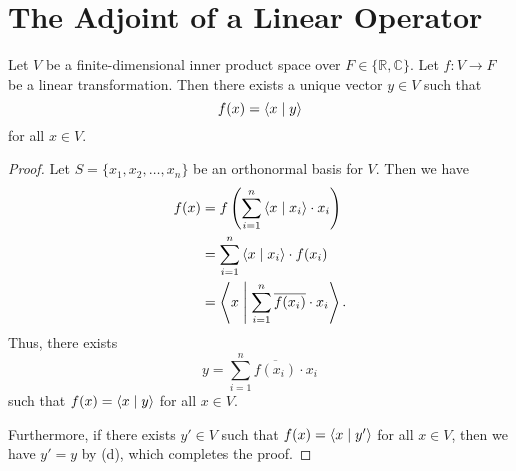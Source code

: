 \section{The Adjoint of a Linear Operator}
\begin{theorem}
  \label{thm:functional}
  Let $V$ be a finite-dimensional inner product space over
  $F \in \{\mathbb{R}, \mathbb{C}\}$.
  Let $f: V \to F$ be a linear transformation.
  Then there exists a unique vector $y \in V$ such that
  \begin{equation*}
    f(x) = \left\langle x \; \middle| \; y \right\rangle
  \end{equation*}
  for all $x \in V$.
\end{theorem}
\begin{proof}
  Let $S = \{x_1, x_2, \dots, x_n\}$ be an orthonormal basis
  for $V$.
  Then we have
  \begin{align*}
    f(x)
    &= f\left(\sum_{i=1}^n \left\langle x \; \middle| \; x_i \right\rangle \cdot x_i\right) \\
    &= \sum_{i=1}^n \left\langle x \; \middle| \; x_i \right\rangle \cdot f(x_i) \\
    &= \left\langle x \; \middle| \; \sum_{i=1}^n \overline{f(x_i)} \cdot x_i \right\rangle.
  \end{align*}
  Thus, there exists
  \begin{equation*}
    y = \sum_{i=1}^n \overline{f(x_i)} \cdot x_i
  \end{equation*}
  such that $f(x) = \left\langle x \; \middle| \; y \right\rangle$ for all $x \in V$.

  Furthermore, if there exists $y' \in V$ such that $f(x) = \left\langle x \; \middle| \; y' \right\rangle$
  for all $x \in V$, then we have $y' = y$ by 
  (d), which completes the proof.
\end{proof}

